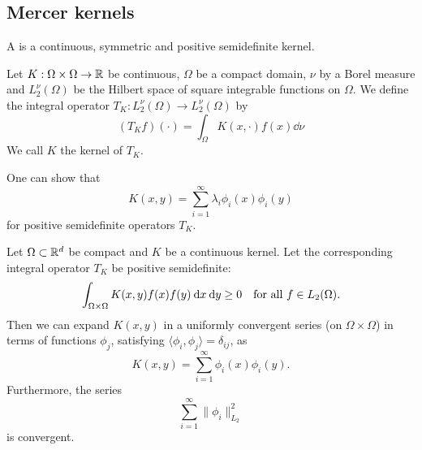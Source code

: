 \documentclass[../lecture-notes.tex]{subfiles}
\begin{document}
\subsection*{Mercer kernels}
\begin{definition} %
\label{thm:35}
A  is a continuous, symmetric and positive semidefinite kernel.
\end{definition}
\begin{definition} %
\label{thm:36}
Let $K : \Omega \times \Omega \to \mathbb{R}$ be continuous, $\Omega$ be a compact domain, $\nu$ by a Borel measure and $L_2^\nu(\Omega)$ be the Hilbert space of square integrable functions on $\Omega$.
We define the integral operator $T_K : L_2^\nu(\Omega) \to L_2^\nu(\Omega)$ by
\[
	\left( T_K f \right) (\cdot) = \int_\Omega K(x, \cdot) f(x) \dd \nu
\]
We call $K$ the kernel of $T_K$.
\end{definition}
One can show that
\[
	K(x, y) = \sum_{i=1}^\infty \lambda_i \phi_i(x) \phi_i(y)
\]
for positive semidefinite operators $T_K$.
\begin{theorem} %
\label{thm:37}
Let $\Omega \subset \mathbb{R}^d$ be compact and $K$ be a continuous kernel.
Let the corresponding integral operator $T_K$ be positive semidefinite:
\[
	\int_{\Omega \times \Omega} K(x, y) f(x) f(y) \:\mathrm{d} x \:\mathrm{d} y \geq 0 \quad \text{for all } f \in L_2(\Omega).
\]
Then we can expand $K(x, y)$ in a uniformly convergent series (on $\Omega \times \Omega$) in terms of functions $\phi_j$, satisfying $\langle \phi_i, \phi_j \rangle = \delta_{ij}$, as
\[
	K(x, y) = \sum_{i=1}^\infty \phi_i(x) \phi_i(y).
\]
Furthermore, the series
\[
	\sum_{i=1}^\infty \| \phi_i \|_{L_2}^2
\]
is convergent.
\end{theorem}
\end{document}
